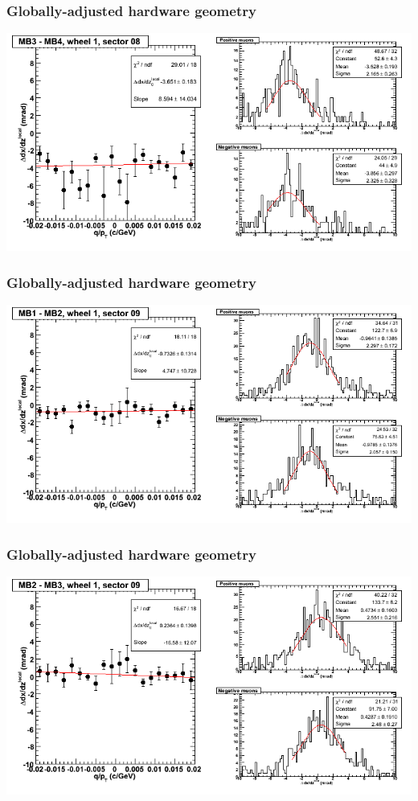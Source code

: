\documentclass[compress]{beamer}
\begin{document}
\begin{frame}
\frametitle{Globally-adjusted hardware geometry}
\includegraphics[width=\linewidth]{NOV4_segdiffs_HW/dt13_slope_D_08_34.png}
\end{frame}

\begin{frame}
\frametitle{Globally-adjusted hardware geometry}
\includegraphics[width=\linewidth]{NOV4_segdiffs_HW/dt13_slope_D_09_12.png}
\end{frame}

\begin{frame}
\frametitle{Globally-adjusted hardware geometry}
\includegraphics[width=\linewidth]{NOV4_segdiffs_HW/dt13_slope_D_09_23.png}
\end{frame}
\end{document}
